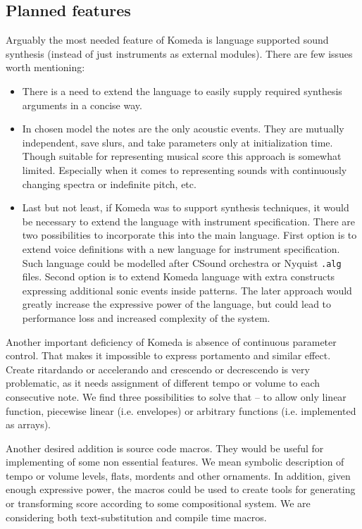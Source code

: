 \documentclass{article}
\begin{document}
\subsection{Planned features}

Arguably the most needed feature of Komeda is language supported sound
synthesis (instead of just instruments as external modules). There are few
issues worth mentioning:

\begin{itemize}
  \item There is a need to extend the language to easily supply required
    synthesis arguments in a concise way.

  \item In chosen model the notes are the only acoustic events. They are
    mutually independent, save slurs, and take parameters only at
    initialization time. Though suitable for representing musical score this
    approach is somewhat limited. Especially when it comes to representing
    sounds with continuously changing spectra or indefinite pitch, etc. 	

  \item Last but not least, if Komeda was to support synthesis techniques, it
    would be necessary to extend the language with instrument specification.
    There are two possibilities to incorporate this into the main language.
    First option is to extend voice definitions with a new language for
    instrument specification. Such language could be modelled after CSound
    orchestra \cite{csound} or Nyquist {\tt .alg} \cite{alg} files. Second
    option is to extend Komeda language with extra constructs expressing
    additional sonic events inside patterns. The later approach would greatly
    increase the expressive power of the language, but could lead to
    performance loss and increased complexity of the system. 
\end{itemize}

Another important deficiency of Komeda is absence of continuous parameter
control. That makes it impossible to express portamento and similar effect.
Create ritardando or accelerando and crescendo or decrescendo is very
problematic, as it needs assignment of different tempo or volume to each
consecutive note. We find three possibilities to solve that -- to allow only
linear function, piecewise linear (i.e. envelopes) or arbitrary functions (i.e.
implemented as arrays).

Another desired addition is source code macros. They would be useful for
implementing of some non essential features. We mean symbolic description of
tempo or volume levels, flats, mordents and other ornaments. In addition, given
enough expressive power, the macros could be used to create tools for
generating or transforming score according to some compositional system. We are
considering both text-substitution and compile time macros.
\end{document}
